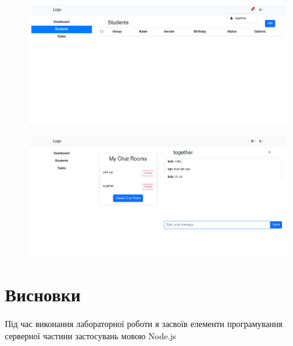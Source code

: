 \documentclass{article}
\begin{document}
\begin{normalsize}
\begin{figure}[H]
	\centering
	\includegraphics[width=\textwidth]{4}
\end{figure}

\begin{figure}[H]
	\centering
	\includegraphics[width=\textwidth]{5}
\end{figure}

\section*{Висновки}
Під час виконання лабораторної роботи я засвоїв елементи програмування серверної частини застосувань мовою Node.js
	    
\end{normalsize}
\end{document}
